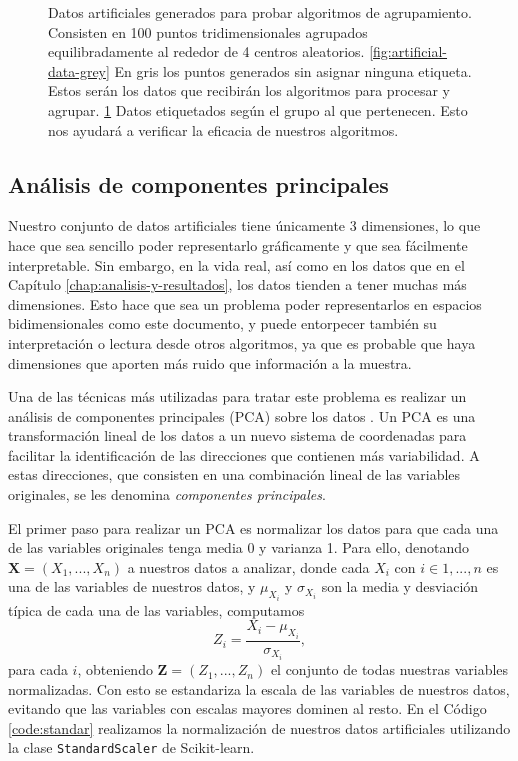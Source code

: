 \begin{figure}[h]
\begin{subfigure}{0.45\textwidth}
    \caption{}
    \label{fig:artificial-data-labeled}
  \end{subfigure}
  \caption[Datos artificiales para la prueba de algoritmos.]{Datos artificiales generados para probar algoritmos de agrupamiento. Consisten en 100 puntos tridimensionales agrupados equilibradamente al rededor de 4 centros aleatorios. \ref{fig:artificial-data-grey} En gris los puntos generados sin asignar ninguna etiqueta. Estos serán los datos que recibirán los algoritmos para procesar y agrupar. \ref{fig:artificial-data-labeled} Datos etiquetados según el grupo al que pertenecen. Esto nos ayudará a verificar la eficacia de nuestros algoritmos.}
  \label{fig:artificial-data}
\end{figure}

\subsection{Análisis de componentes principales}

Nuestro conjunto de datos artificiales tiene únicamente 3 dimensiones, lo que hace que sea sencillo poder representarlo gráficamente y que sea fácilmente interpretable. Sin embargo, en la vida real, así como en los datos que en el Capítulo \ref{chap:analisis-y-resultados}, los datos tienden a tener muchas más dimensiones. Esto hace que sea un problema poder representarlos en espacios bidimensionales como este documento, y puede entorpecer también su interpretación o lectura desde otros algoritmos, ya que es probable que haya dimensiones que aporten más ruido que información a la muestra.

Una de las técnicas más utilizadas para tratar este problema es realizar un análisis de componentes principales (PCA) sobre los datos \cite{pca}. Un PCA es una transformación lineal de los datos a un nuevo sistema de coordenadas para facilitar la identificación de las direcciones que contienen más variabilidad. A estas direcciones, que consisten en una combinación lineal de las variables originales, se les denomina \textit{componentes principales}.

El primer paso para realizar un PCA es normalizar los datos para que cada una de las variables originales tenga media 0 y varianza 1. Para ello, denotando $ \textbf{X} = (X_1, ..., X_n) $ a nuestros datos a analizar, donde cada $ X_i $ con $ i \in {1, ..., n} $ es una de las variables de nuestros datos, y $ \mu_{X_i} $ y $ \sigma_{X_i} $ son la media y desviación típica de cada una de las variables, computamos
\begin{equation}
  Z_i = \frac{X_i - \mu_{X_i}}{\sigma_{X_i}},
\end{equation}
para cada $ i $, obteniendo $ \textbf{Z} = (Z_1, ..., Z_n) $ el conjunto de todas nuestras variables normalizadas. Con esto se estandariza la escala de las variables de nuestros datos, evitando que las variables con escalas mayores dominen al resto. En el Código \ref{code:standar} realizamos la normalización de nuestros datos artificiales utilizando la clase \texttt{StandardScaler} de Scikit-learn.

